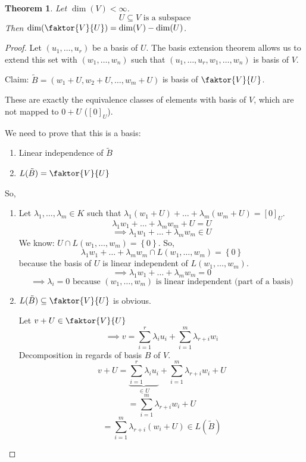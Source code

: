 \documentclass[a4paper,landscape,twocolumn]{article}
\newcommand\set[1]{\left\{#1\right\}}
\newtheorem{theorem}{Theorem}[section]
\begin{document}
\begin{theorem}
  \label{satz-4-24}
  Let $\dim(V) < \infty$.
  \[ U \subseteq V \text{ is a subspace} \]
  Then $\dim(\faktor{V}{U}) = \dim(V) - \dim(U)$.
\end{theorem}
\begin{proof}
  Let $(u_1, \dots, u_r)$ be a basis of $U$.
  The basis extension theorem allows us to extend this set with
  $(w_1, \dots, w_n)$ such that $(u_1, \dots, u_r, w_1, \dots, w_n)$ is basis of $V$.

  Claim: $\tilde{B} = (w_1 + U, w_2 + U, \dots, w_m + U)$ is basis of $\faktor{V}{U}$.

  These are exactly the equivalence classes of elements with basis of $V$,
  which are not mapped to $0 + U$ ($[0]_U$).

  We need to prove that this is a basis:
  \begin{enumerate}
    \item Linear independence of $\tilde{B}$
    \item $L(\tilde{B}) = \faktor{V}{U}$
  \end{enumerate}
  So,
  \begin{enumerate}
    \item
      Let $\lambda_1, \dots, \lambda_m \in K$ such that $\lambda_1 (w_1 + U) + \dots + \lambda_m (w_m + U) = [0]_U$.
      \[ \lambda_1 w_1 + \dots + \lambda_m w_m + U = U \]
      \[ \implies \lambda_1 w_1 + \dots + \lambda_m w_m \in U \]
      We know: $U \cap L(w_1, \dots, w_m) = \set{0}$. So,
      \[ \lambda_1 w_1 + \dots + \lambda_m w_m \cap L(w_1, \dots, w_m) = \set{0} \]
      because the basis of $U$ is linear independent of $L(w_1, \dots, w_m)$.
      \[ \implies \lambda_1 w_1 + \dots + \lambda_m w_m = 0 \]
      \[ \implies \lambda_i = 0 \text{ because } (w_1, \dots, w_m) \text{ is linear independent (part of a basis)} \]
    \item
      $L(\tilde{B}) \subseteq \faktor{V}{U}$ is obvious.

      Let $v + U \in \faktor{V}{U}$
      \[ \implies v = \sum_{i=1}^r \lambda_i u_i + \sum_{i=1}^m \lambda_{r+i} w_i \]
      Decomposition in regards of basis $B$ of $V$.
      \[ v + U  = \underbrace{\sum_{i=1}^r \lambda_i u_i}_{\in U} + \sum_{i=1}^m \lambda_{r+i} w_i + U \]
      \[ = \sum_{i=1}^m \lambda_{r+i} w_i + U \]
      \[ = \sum_{i=1}^m \lambda_{r+i} \left(w_i + U\right) \in L(\tilde{B}) \]
  \end{enumerate}
\end{proof}
\end{document}
